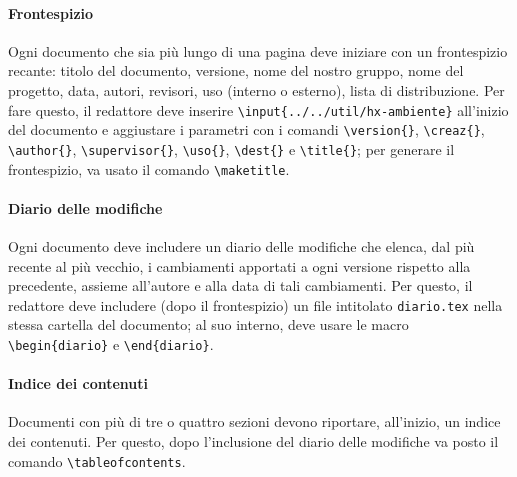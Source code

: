			\paragraph{Frontespizio} 
				Ogni documento che sia più lungo di una pagina deve iniziare con un frontespizio recante: titolo del documento, versione, nome del nostro gruppo, nome del progetto, data, autori, revisori, uso (interno o esterno), lista di distribuzione. Per fare questo, il redattore deve inserire \texttt{\textbackslash input\{../../util/hx-ambiente\}} all'inizio del documento e aggiustare i parametri con i comandi \texttt{\textbackslash version\{\}}, \texttt{\textbackslash creaz\{\}}, \texttt{\textbackslash author\{\}}, \texttt{\textbackslash supervisor\{\}}, \texttt{\textbackslash uso\{\}}, \texttt{\textbackslash dest\{\}} e \texttt{\textbackslash title\{\}}; per generare il frontespizio, va usato il comando \texttt{\textbackslash maketitle}.
			\paragraph{Diario delle modifiche} 
				Ogni documento deve includere un diario delle modifiche che elenca, dal più recente al più vecchio, i cambiamenti apportati a ogni versione rispetto alla precedente, assieme all'autore e alla data di tali cambiamenti. Per questo, il redattore deve includere (dopo il frontespizio) un file intitolato \texttt{diario.tex} nella stessa cartella del documento; al suo interno, deve usare le macro \texttt{\textbackslash begin\{diario\}} e \texttt{\textbackslash end\{diario\}}.
			\paragraph{Indice dei contenuti} 
				Documenti con più di tre o quattro sezioni devono riportare, all'inizio, un indice dei contenuti. Per questo, dopo l'inclusione del diario delle modifiche va posto il comando \texttt{\textbackslash tableofcontents}.
